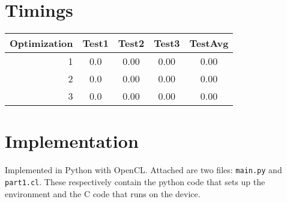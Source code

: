\documentclass[12pt]{article}
\begin{document}
\section{ Timings }

\begin{center}
    \begin{tabular}{r | c | c | c | c |}
	\hline
   	Optimization & Test1 & Test2 & Test3 & TestAvg \\
   	\hline
   	1            & 0.0   & 0.00  & 0.00  & 0.00     \\
   	2            & 0.0   & 0.00  & 0.00  & 0.00     \\
   	3            & 0.0   & 0.00  & 0.00  & 0.00     \\
    \end{tabular}
\end{center}

\newpage
\section{ Implementation }

Implemented in Python with OpenCL. Attached are two files: \texttt{main.py} and \texttt{part1.cl}. These respectively contain the python code that sets up the environment and the C code that runs on the device.
 
% 
\end{document}
